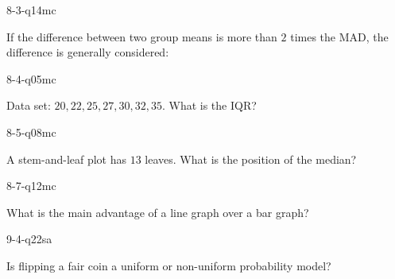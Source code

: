 \begin{practiceQuestion}{8-3-q14}{mc}
\begin{questionText}
If the difference between two group means is more than $2$ times the MAD, the difference is generally considered:
\end{questionText}
\end{practiceQuestion}

\begin{practiceQuestion}{8-4-q05}{mc}
\begin{questionText}
Data set: $20, 22, 25, 27, 30, 32, 35$. What is the IQR?
\end{questionText}
\end{practiceQuestion}

\begin{practiceQuestion}{8-5-q08}{mc}
\begin{questionText}
A stem-and-leaf plot has $13$ leaves. What is the position of the median?
\end{questionText}
\end{practiceQuestion}

\begin{practiceQuestion}{8-7-q12}{mc}
\begin{questionText}
What is the main advantage of a line graph over a bar graph?
\end{questionText}
\end{practiceQuestion}

\begin{practiceQuestion}{9-4-q22}{sa}
\begin{questionText}
Is flipping a fair coin a uniform or non-uniform probability model?
\end{questionText}
\end{practiceQuestion}

